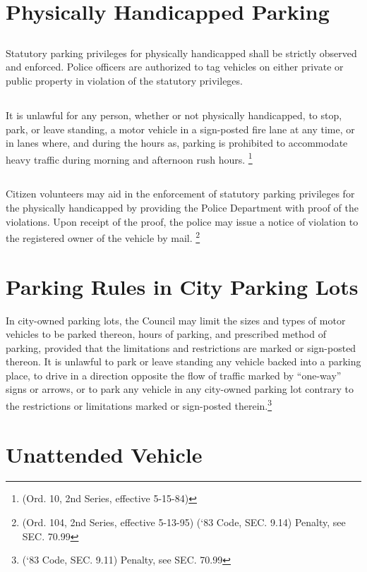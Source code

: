 \section{Physically Handicapped Parking}
\subsection{}
Statutory parking privileges for physically handicapped shall be strictly observed and enforced.  Police officers are authorized to tag vehicles on either private or public property in violation of the statutory privileges.
\subsection{}
It is unlawful for any person, whether or not physically handicapped, to stop, park, or leave standing, a motor vehicle in a sign-posted fire lane at any time, or in lanes where, and during the hours as, parking is prohibited to accommodate heavy traffic during morning and afternoon rush hours. \footnote{(Ord. 10, 2nd Series, effective 5-15-84)}
\subsection{}
Citizen volunteers may aid in the enforcement of statutory parking privileges for the physically handicapped by providing the Police Department with proof of the violations.  Upon receipt of the proof, the police may issue a notice of violation to the registered owner of the vehicle by mail. \footnote{(Ord. 104, 2nd Series, effective 5-13-95) (‘83 Code, SEC. 9.14) Penalty, see SEC. 70.99}

\section{Parking Rules in City Parking Lots}
In city-owned parking lots, the Council may limit the sizes and types of motor vehicles to be parked thereon, hours of parking, and prescribed method of parking, provided that the limitations and restrictions are marked or sign-posted thereon.  It is unlawful to park or leave standing any vehicle backed into a parking place, to drive in a direction opposite the flow of traffic marked by “one-way” signs or arrows, or to park any vehicle in any city-owned parking lot contrary to the restrictions or limitations marked or sign-posted therein.\footnote{(‘83 Code, SEC. 9.11)  Penalty, see SEC. 70.99}

\section{Unattended Vehicle}
